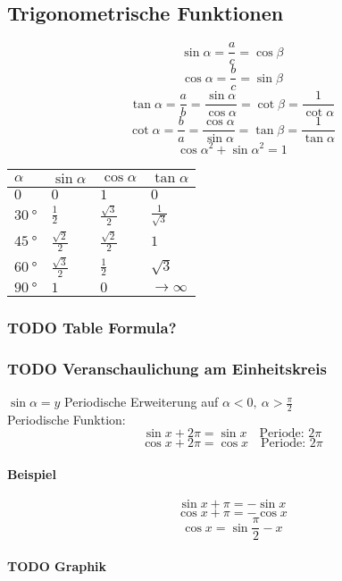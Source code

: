 \documentclass[a4paper]{scrartcl}
\begin{document}
\subsection{Trigonometrische Funktionen}
\label{sec-5-7}
\[\sin{\alpha} = \frac{a}{c} = \cos{\beta}\]
\[\cos{\alpha} = \frac{b}{c} = \sin{\beta}\]
\[\tan{\alpha} = \frac{a}{b}=\frac{\sin{\alpha}}{\cos{\alpha}} = \cot{\beta} = \frac{1}{\cot{\alpha}}\]
\[\cot{\alpha} = \frac{b}{a}=\frac{\cos{\alpha}}{\sin{\alpha}} = \tan{\beta} = \frac{1}{\tan{\alpha}}\]
\[\cos{\alpha}^2 + \sin{\alpha}^2 = 1\]

\begin{center}
\begin{tabular}{llll}
$\alpha$ & $\sin{\alpha}$ & $\cos{\alpha}$ & $\tan{\alpha}$\\
\hline
$0$ & $0$ & $1$ & $0$\\
$\SI{30}{\degree}$ & $\frac{1}{2}$ & $\frac{\sqrt{3}}{2}$ & $\frac{1}{\sqrt{3}}$\\
$\SI{45}{\degree}$ & $\frac{\sqrt{2}}{2}$ & $\frac{\sqrt{2}}{2}$ & $1$\\
$\SI{60}{\degree}$ & $\frac{\sqrt{3}}{2}$ & $\frac{1}{2}$ & $\sqrt{3}$\\
$\SI{90}{\degree}$ & $1$ & $0$ & $\to\infty$\\
\end{tabular}
\end{center}
\subsubsection{{\bfseries\sffamily TODO} Table Formula?}
\label{sec-5-7-1}
\subsubsection{{\bfseries\sffamily TODO} Veranschaulichung am Einheitskreis}
\label{sec-5-7-2}
$\sin{\alpha} = y$
Periodische Erweiterung auf $\alpha < 0,~\alpha>\frac{\pi}{2}$ \\
    Periodische Funktion: \[\sin{x + 2\pi} = \sin{x}\quad\text{Periode: }2\pi\]
\[\cos{x + 2\pi} = \cos{x}\quad\text{Periode: }2\pi\]
\paragraph{Beispiel}
\label{sec-5-7-2-1}
\[\sin{x + \pi} = -\sin{x}\]
\[\cos{x + \pi} = -\cos{x}\]
\[\cos{x} = \sin{\frac{\pi}{2}-x}\]
\paragraph{{\bfseries\sffamily TODO} Graphik}
\label{sec-5-7-2-2}
\end{document}
